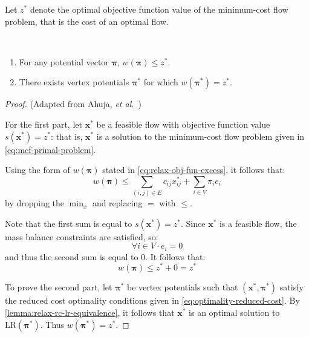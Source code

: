 \begin{defn}
Let $z^*$ denote the optimal objective function value of the minimum-cost flow problem, that is the cost of an optimal flow. \\
\end{defn}

\begin{lemma} \label{lemma:relax-dual-optimality}
~ %
\begin{enumerate}[label=(\alph*)]
    \item For any potential vector $\boldsymbol{\pi}$, $w(\boldsymbol{\pi}) \leq z^*$.
    \item There exists vertex potentials $\boldsymbol{\pi}^*$ for which $w(\boldsymbol{\pi}^*) = z^*$.
\end{enumerate}
\end{lemma}
\begin{proof} (Adapted from Ahuja, \textit{et al.}~\cite[lemma.~9.16]{Ahuja:1993})
    
For the first part, let $\mathbf{x}^*$ be a feasible flow with objective function value $s(\mathbf{x}^*) = z^*$: that is, $\mathbf{x}^*$ is a solution to the minimum-cost flow problem given in \cref{eq:mcf-primal-problem}.

Using the form of $w(\boldsymbol{\pi})$ stated in \cref{eq:relax-obj-fun-excess}, it follows that:
\[w(\boldsymbol{\pi})\leq\sum_{\left(i,j\right)\in E}c_{ij}x_{ij}^{*}+\sum_{i\in V}\pi_{i}e_{i}\]
by dropping the $\min_x$ and replacing $=$ with $\leq$.

Note that the first sum is equal to $s(\mathbf{x}^*) = z^*$. Since $\mathbf{x}^*$ is a feasible flow, the mass balance constraints are satisfied, so:
\[\forall i \in V\cdot e_i = 0\]
and thus the second sum is equal to $0$. It follows that:
\[w(\boldsymbol{\pi}) \leq z^* + 0 = z^*\]

To prove the second part, let $\boldsymbol{\pi}^*$ be vertex potentials such that $\left(\mathbf{x}^*,\boldsymbol{\pi}^*\right)$ satisfy the reduced cost optimality conditions given in \cref{eq:optimality-reduced-cost}\footnotemark. By \cref{lemma:relax-rc-lr-equivalence}, it follows that $\mathbf{x}^*$ is an optimal solution to $\mathrm{LR}(\boldsymbol{\pi}^*)$. Thus $w(\boldsymbol{\pi}^*) = z^*$.
\end{proof}


